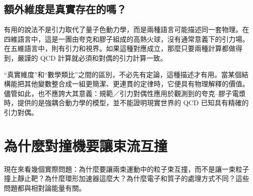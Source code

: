\subsection{額外維度是真實存在的嗎？}

\begin{classroomqa}
\end{classroomqa}

有用的說法不是引力取代了量子色動力學，而是兩種語言可能描述同一套物理。在四維語言中，這是一團由夸克和膠子組成的高熱火球，沒有通常意義下的引力場。在五維語言中，則有引力和視界。如果這種對應成立，那麼只要兩種計算都做得到，嚴謹的 QCD 計算就必須和對偶的引力計算一致。

\begin{classroomqa}
\end{classroomqa}

``真實維度''和``數學類比''之間的區別，不必先有定論，這種描述才有用。當某個結構能把其他變數整合成一組更簡潔、更連貫的定律時，它便具有物理解釋的價值。儘管如此，也不應誇大其意義：規範／引力對偶性應用於觀測到的夸克--膠子電漿時，提供的是強耦合動力學的模型，並不能證明現實世界的 QCD 已知具有精確的引力對偶。

\section{為什麼對撞機要讓束流互撞}

現在來看幾個實際問題：為什麼要讓兩束運動中的粒子束互撞，而不是讓一束粒子撞上靜止靶？為什麼環形加速器這麼大？為什麼電子和質子的處理方式不同？這些問題都與相對論能量有關。

\begin{classroomqa}
\end{classroomqa}

